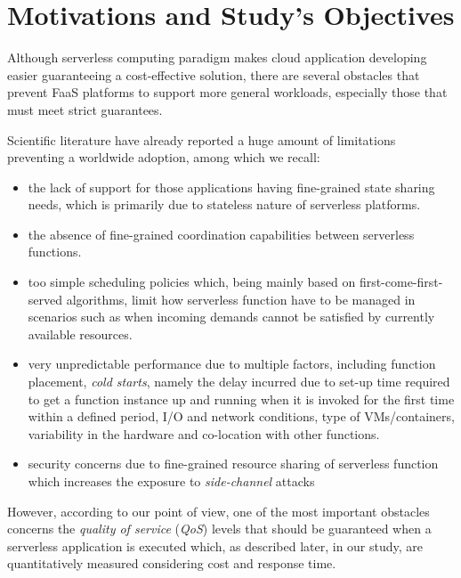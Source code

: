 \documentclass[12pt,a4paper]{report}
\begin{document}
\section{Motivations and Study's Objectives}

Although serverless computing paradigm makes cloud application developing easier guaranteeing a cost-effective solution, there are several obstacles that prevent FaaS platforms to support more general workloads, especially those that must meet strict guarantees.

Scientific literature have already reported a huge amount of limitations preventing a worldwide adoption, among which we recall:

\begin{itemize}
	
	\item the lack of support for those applications having fine-grained state sharing needs, which is primarily due to stateless nature of serverless platforms.
	
	\item the absence of fine-grained coordination capabilities between serverless functions.
	
	\item too simple scheduling policies which, being mainly based on first-come-first-served algorithms, limit how serverless function have to be managed in scenarios such as when incoming demands cannot
	be satisfied by currently available resources.
	
	\item very unpredictable performance due to multiple factors, including
	function placement, \textit{cold starts}, namely the delay incurred due to set-up time required to get a function instance up and running when it is invoked for the first time within a defined period, I/O and network conditions, type of VMs/containers, variability in the hardware and co-location with other functions.
	
	\item security concerns due to fine-grained resource sharing of serverless function which increases the exposure to \textit{side-channel} attacks
	
\end{itemize}

However, according to our point of view, one of the most important obstacles concerns the \textit{quality of service} (\textit{QoS}) levels that should be guaranteed when a serverless application is executed which, as described later, in our study, are quantitatively measured considering cost and response time.
\end{document}
